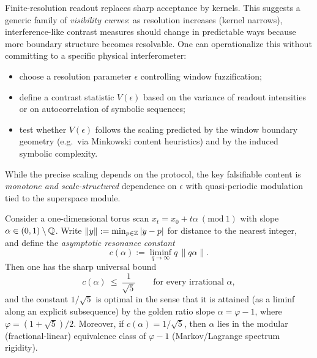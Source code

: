 Finite-resolution readout replaces sharp acceptance by kernels. This suggests a generic family of \emph{visibility curves}: as resolution increases (kernel narrows), interference-like contrast measures should change in predictable ways because more boundary structure becomes resolvable. One can operationalize this without committing to a specific physical interferometer:
\begin{itemize}[leftmargin=*,itemsep=2pt]
  \item choose a resolution parameter $\epsilon$ controlling window fuzzification;
  \item define a contrast statistic $V(\epsilon)$ based on the variance of readout intensities or on autocorrelation of symbolic sequences;
  \item test whether $V(\epsilon)$ follows the scaling predicted by the window boundary geometry (e.g.\ via Minkowski content heuristics) and by the induced symbolic complexity.
\end{itemize}
While the precise scaling depends on the protocol, the key falsifiable content is \emph{monotone and scale-structured} dependence on $\epsilon$ with quasi-periodic modulation tied to the superspace module.

\begin{proposition}\label{prop:P2}
Consider a one-dimensional torus scan $x_t=x_0+t\alpha\ (\mathrm{mod}\ 1)$ with slope $\alpha\in(0,1)\setminus\mathbb{Q}$.
Write $\|y\|:=\min_{p\in\mathbb{Z}}|y-p|$ for distance to the nearest integer, and define the \emph{asymptotic resonance constant}
\[
c(\alpha):=\liminf_{q\to\infty} q\,\|q\alpha\|.
\]
Then one has the sharp universal bound
\[
c(\alpha)\ \le\ \frac{1}{\sqrt5}\qquad\text{for every irrational }\alpha,
\]
and the constant $1/\sqrt5$ is optimal in the sense that it is attained (as a liminf along an explicit subsequence) by the golden ratio slope $\alpha=\varphi-1$, where $\varphi=(1+\sqrt5)/2$.
Moreover, if $c(\alpha)=1/\sqrt5$, then $\alpha$ lies in the modular (fractional-linear) equivalence class of $\varphi-1$ (Markov/Lagrange spectrum rigidity).
\end{proposition}

